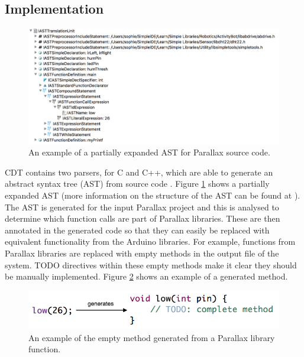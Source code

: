\documentclass{UoYCSproject}
\begin{document}
\subsection{Implementation} \label{parallax_impl}
\begin{figure}[h!]
  \centering
  \includegraphics[width=0.8\linewidth]{graphics/ast_diagram.png}
  \caption{An example of a partially expanded AST for Parallax source code.}
  \label{fig:ast_diagram}
\end{figure}

CDT contains two parsers, for C and C++, which are able to generate an abstract syntax tree (AST) from source code \parencite{cdt_parsing}. Figure \ref{fig:ast_diagram} shows a partially expanded AST (more information on the structure of the AST can be found at \parencite{ast_structure}). The AST is generated for the input Parallax project and this is analysed to determine which function calls are part of Parallax libraries. These are then annotated in the generated code so that they can easily be replaced with equivalent functionality from the Arduino libraries. For example, functions from Parallax libraries are replaced with empty methods in the output file of the system. TODO directives within these empty methods make it clear they should be manually implemented. Figure \ref{fig:gen_stub} shows an example of a generated method.

\begin{figure}[h!]
  \centering
  \includegraphics[width=0.8\linewidth]{graphics/generated_method_stub.png}
  \caption{An example of the empty method generated from a Parallax library function.}
  \label{fig:gen_stub}
\end{figure}
\end{document}
